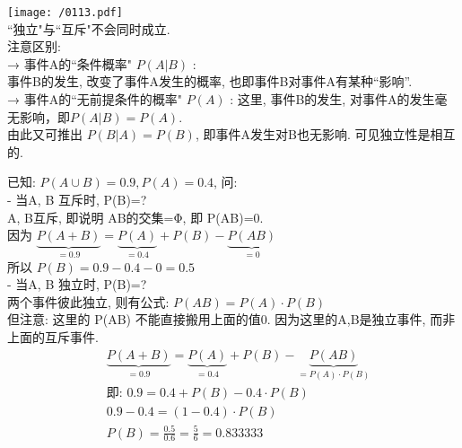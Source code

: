 \documentclass[UTF8]{ctexart}
\begin{document}
\texttt{[image: /0113.pdf]} \\


``独立"与``互斥"不会同时成立. \\



	
注意区别:	\\
→ 事件A的``条件概率" $P(A|B)$ :  \\
 事件B的发生, 改变了事件A发生的概率, 也即事件B对事件A有某种``影响”. \\
 
→ 事件A的``无前提条件的概率" $P(A)$ : 这里, 事件B的发生, 对事件A的发生毫无影响，即$ P(A|B)=P(A)$.  \\
由此又可推出 $ P(B|A)=P(B)$, 即事件A发生对B也无影响. 可见独立性是相互的.  \\


\begin{myEnvSample}
已知: $P(A \cup B)=0.9, P(A)=0.4$, 问: \\

- 当A, B 互斥时, P(B)=? \\
A, B互斥, 即说明 AB的交集=Φ,  即 P(AB)=0. \\
因为 $\underset{=0.9}{\underbrace{P(A+B)}}=\underset{=0.4}{\underbrace{P(A)}}+P(B)-\underset{=0}{\underbrace{P(AB)}}$ \\
所以 $P(B)=0.9-0.4-0=0.5$ \\



- 当A, B 独立时, P(B)=? \\
两个事件彼此独立, 则有公式: $P(AB) = P(A) \cdot P(B)$ \\
但注意: 这里的 P(AB) 不能直接搬用上面的值0. 因为这里的A,B是独立事件, 而非上面的互斥事件.  
\begin{align*}  %
	&\underset{=0.9}{\underbrace{P(A+B)}}=\underset{=0.4}{\underbrace{P(A)}}+P(B)-\underset{=P(A)\cdot P(B)}{\underbrace{P(AB)}}\\
&\text{即:\ }0.9=0.4+P(B)-0.4\cdot P(B)\\
&0.9-0.4=(1-0.4)\cdot P(B)\\
&P(B)=\frac{0.5}{0.6}=\frac{5}{6}=0.833333
\end{align*}







\end{myEnvSample}
\end{document}
